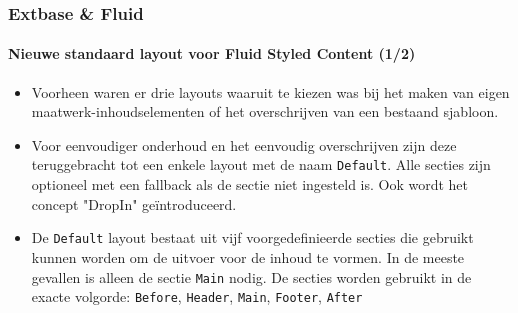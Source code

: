 
\begin{frame}[fragile]
	\frametitle{Extbase \& Fluid}
	\framesubtitle{Nieuwe standaard layout voor Fluid Styled Content (1/2)}

	\begin{itemize}
		\item Voorheen waren er drie layouts waaruit te kiezen was bij het maken
			van eigen maatwerk-inhoudselementen of het overschrijven van
			een bestaand sjabloon.

		\item Voor eenvoudiger onderhoud en het eenvoudig overschrijven zijn deze
		 	teruggebracht tot een enkele layout met de naam \texttt{Default}.
		 	Alle secties zijn optioneel met een fallback als de sectie niet ingesteld
		 	is. Ook wordt het concept "DropIn" geïntroduceerd.

		\item De \texttt{Default} layout bestaat uit vijf voorgedefinieerde secties
			die gebruikt kunnen worden om de uitvoer voor de inhoud te vormen.
			In de meeste gevallen is alleen de sectie \texttt{Main} nodig. De secties
			worden gebruikt in de exacte volgorde:
			\texttt{Before}, \texttt{Header}, \texttt{Main}, \texttt{Footer}, \texttt{After}
	\end{itemize}

\end{frame}



